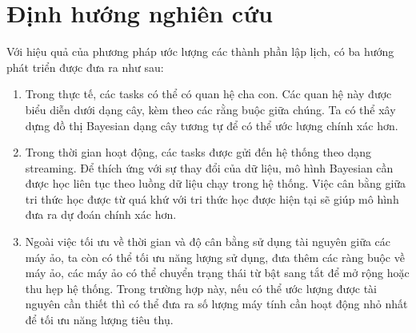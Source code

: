 \documentclass{my_style}
\begin{document}
\section{Định hướng nghiên cứu}
Với hiệu quả của phương pháp ước lượng các thành phần lập lịch, có ba hướng phát triển được đưa ra như sau: 
\begin{enumerate}
	\item Trong thực tế, các tasks có thể có quan hệ cha con. Các quan hệ này được biểu diễn dưới dạng cây, kèm theo các rằng buộc giữa chúng. Ta có thể xây dựng đồ thị Bayesian dạng cây tương tự để có thể ước lượng chính xác hơn. 
	\item Trong thời gian hoạt động, các tasks được gửi đến hệ thống theo dạng streaming. Để thích ứng với sự thay đổi của dữ liệu, mô hình Bayesian cần được học liên tục theo luồng dữ liệu chạy trong hệ thống. Việc cân bằng giữa tri thức học được từ quá khứ với tri thức học được hiện tại sẽ giúp mô hình đưa ra dự đoán chính xác hơn.
	\item Ngoài việc tối ưu về thời gian và độ cân bằng sử dụng tài nguyên giữa các máy ảo, ta còn có thể tối ưu năng lượng sử dụng, đưa thêm các ràng buộc về máy ảo, các máy ảo có thể chuyển trạng thái từ bật sang tắt để mở rộng hoặc thu hẹp hệ thống. Trong trường hợp này, nếu có thể ước lượng được tài nguyên cần thiết thì có thể đưa ra số lượng máy tính cần hoạt động nhỏ nhất để tối ưu năng lượng tiêu thụ. 
\end{enumerate}

\newpage
\medskip
\printbibliography[title={Tài liệu tham khảo}]

\newpage 
\end{document}
